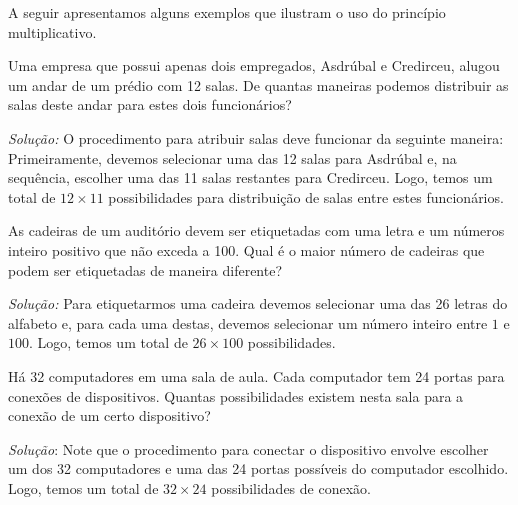 A seguir apresentamos alguns exemplos que ilustram o uso do princípio
multiplicativo.

\begin{Example}
Uma empresa que possui apenas dois empregados, Asdrúbal e Credirceu,
alugou um andar de um prédio com 12 salas. De quantas maneiras podemos
distribuir as salas deste andar para estes dois funcionários?

\textit{Solução:} O procedimento para atribuir salas deve funcionar da
seguinte maneira: Primeiramente, devemos selecionar uma das 12 salas para
Asdrúbal e, na sequência, escolher uma das 11 salas restantes para
Credirceu. Logo, temos um total de $12 \times 11$ possibilidades para
distribuição de salas entre estes funcionários.
\end{Example}

\begin{Example}
As cadeiras de um auditório devem ser etiquetadas com uma letra e um
números inteiro positivo que não exceda a 100. Qual é o maior número
de cadeiras que podem ser etiquetadas de maneira diferente?

\textit{Solução:} Para etiquetarmos uma cadeira devemos selecionar uma
das 26 letras do alfabeto e, para cada uma destas, devemos selecionar
um número inteiro entre $1$ e $100$. Logo, temos um total de $26
\times 100$ possibilidades.
\end{Example}

\begin{Example}
Há 32 computadores em uma sala de aula. Cada computador tem 24
portas para conexões de dispositivos. Quantas possibilidades existem
nesta sala para a conexão de um certo dispositivo?

\textit{Solução}: Note que o procedimento para conectar o dispositivo
envolve escolher um dos 32 computadores e uma das 24 portas possíveis
do computador escolhido. Logo, temos um total de $32 \times 24$
possibilidades de conexão.
\end{Example}

